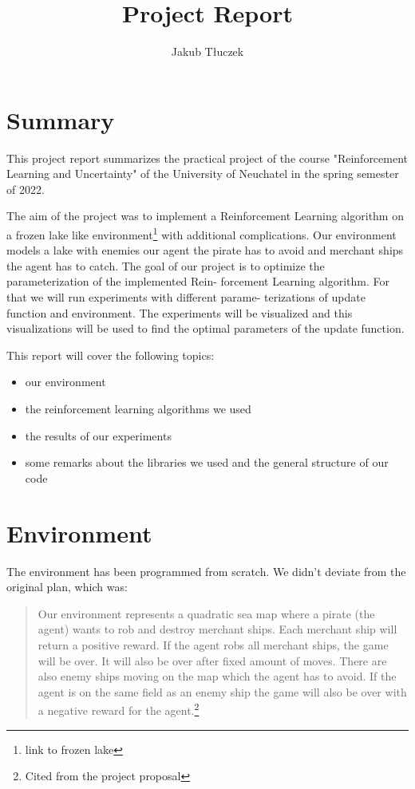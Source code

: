 \documentclass[11pt]{article} %
\title{Project Report}
\author{Jakub Tłuczek}
\begin{document}
\maketitle

\section{Summary}
This project report summarizes the practical project of the course "Reinforcement Learning and Uncertainty" of the University of Neuchatel in the spring semester of 2022.

The aim of the project was to implement a Reinforcement Learning algorithm on a frozen lake like environment\footnote{link to frozen lake} with additional complications. Our environment models a lake with enemies our agent the pirate has to avoid and merchant ships the agent has to catch. 
The goal of our project is to optimize the parameterization of the implemented Rein-
forcement Learning algorithm. For that we will run experiments with different parame-
terizations of update function and environment. The experiments will be visualized and
this visualizations will be used to find the optimal parameters of the update function.

This report will cover the following topics:
\begin{itemize}
	\item our environment
	\item the reinforcement learning algorithms we used
	\item the results of our experiments
	\item some remarks about the libraries we used and the general structure of our code
\end{itemize}

\section{Environment}
The environment has been programmed from scratch. We didn't deviate from the original plan, which was:


\begin{quote}
Our environment represents a quadratic sea map where a pirate (the agent) wants to rob and destroy merchant ships. Each merchant ship will return a positive reward. If the agent robs all merchant ships, the game will be over. It will also be over after fixed amount of moves. There are also enemy ships moving on the map which the agent has to avoid. If the agent is on the same field as an enemy ship the game will also be over with a negative reward for the agent.\footnote{Cited from the project proposal}
\end{quote}
\end{document}
